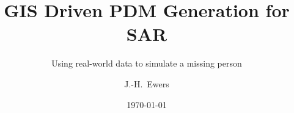 \documentclass[10pt,t]{beamer}
\title[GIS PDM Generation]{GIS Driven PDM Generation for SAR}
\author[Ewers]{J.-H.~Ewers\inst{1}}
\subtitle{Using real-world data to simulate a missing person}
\institute[ASRD]{
  \inst{1}
  Aerospace Sciences Research Division\\
  University of Glasgow}
\date{\today}
\begin{document}
\begin{noheadline}
\frame{\titlepage}
\end{noheadline}
	




\end{document}
